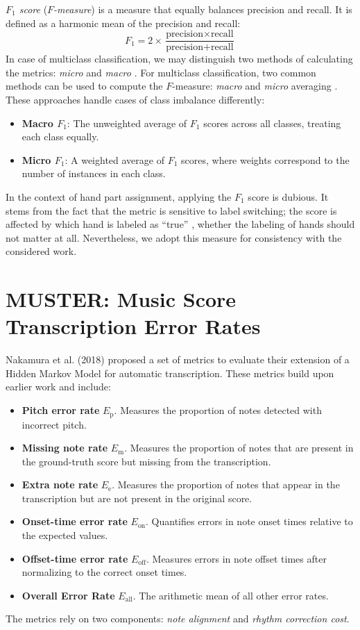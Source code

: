 \emph{$F_1$ score} (\emph{$F$-measure}) is a measure that equally balances precision and recall. It is defined as a harmonic mean of the precision and recall: \[F_1 = 2 \times \frac{\textrm{precision} \times \textrm{recall}}{\textrm{precision} + \textrm{recall}}\] In case of multiclass classification, we may distinguish two methods of calculating the metrics: \emph{micro} and \emph{macro} \cite[p. 259--261]{Manning2008}. For multiclass classification, two common methods can be used to compute the $F$-measure: \emph{macro} and \emph{micro} averaging \cite[p. 259--261]{Manning2008}. These approaches handle cases of class imbalance differently:\begin{itemize}
	\item \textbf{Macro $F_1$}: The unweighted average of $F_1$ scores across all classes, treating each class equally.
	\item \textbf{Micro $F_1$}: A weighted average of $F_1$ scores, where weights correspond to the number of instances in each class.\end{itemize}

In the context of hand part assignment, applying the $F_1$ score is dubious. It stems from the fact that the metric is sensitive to label switching; the score is affected by which hand is labeled as ``true'' \cite{Sokolova2009}, whether the labeling of hands should not matter at all. Nevertheless, we adopt this measure for consistency with the considered work.

\section{MUSTER: Music Score Transcription Error Rates}

Nakamura et al. (2018) proposed a set of metrics to evaluate their extension of a Hidden Markov Model \cite{Nakamura2018} for automatic transcription. These metrics build upon earlier work \cite{Nakamura2017a} and include: \begin{itemize}
	\item \textbf{Pitch error rate} $E_{\textrm{p}}$. Measures the proportion of notes detected with incorrect pitch.
	\item \textbf{Missing note rate} $E_{\textrm{m}}$. Measures the proportion of notes that are present in the ground-truth score but missing from the transcription.
	\item \textbf{Extra note rate} $E_{\textrm{e}}$. Measures the proportion of notes that appear in the transcription but are not present in the original score.
	\item \textbf{Onset-time error rate} $E_{\textrm{on}}$. Quantifies errors in note onset times relative to the expected values.
	\item \textbf{Offset-time error rate} $E_{\textrm{off}}$. Measures errors in note offset times after normalizing to the correct onset times.
	\item \textbf{Overall Error Rate} $E_{\textrm{all}}$. The arithmetic mean of all other error rates.
\end{itemize} The metrics rely on two components: \emph{note alignment} and \emph{rhythm correction cost}.

